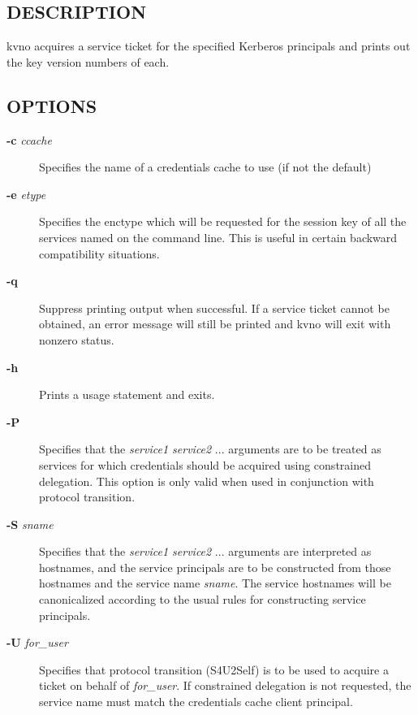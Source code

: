 \documentclass[letterpaper,10pt,english]{sphinxmanual}
\begin{document}
\subsection{DESCRIPTION}
\label{user/user_commands/kvno:description}
kvno acquires a service ticket for the specified Kerberos principals
and prints out the key version numbers of each.


\subsection{OPTIONS}
\label{user/user_commands/kvno:options}\begin{description}
\item[{\textbf{-c} \emph{ccache}}] \leavevmode
Specifies the name of a credentials cache to use (if not the
default)

\item[{\textbf{-e} \emph{etype}}] \leavevmode
Specifies the enctype which will be requested for the session key
of all the services named on the command line.  This is useful in
certain backward compatibility situations.

\item[{\textbf{-q}}] \leavevmode
Suppress printing output when successful.  If a service ticket
cannot be obtained, an error message will still be printed and
kvno will exit with nonzero status.

\item[{\textbf{-h}}] \leavevmode
Prints a usage statement and exits.

\item[{\textbf{-P}}] \leavevmode
Specifies that the \emph{service1 service2} ...  arguments are to be
treated as services for which credentials should be acquired using
constrained delegation.  This option is only valid when used in
conjunction with protocol transition.

\item[{\textbf{-S} \emph{sname}}] \leavevmode
Specifies that the \emph{service1 service2} ... arguments are
interpreted as hostnames, and the service principals are to be
constructed from those hostnames and the service name \emph{sname}.
The service hostnames will be canonicalized according to the usual
rules for constructing service principals.

\item[{\textbf{-U} \emph{for\_user}}] \leavevmode
Specifies that protocol transition (S4U2Self) is to be used to
acquire a ticket on behalf of \emph{for\_user}.  If constrained
delegation is not requested, the service name must match the
credentials cache client principal.

\end{description}
\end{document}

